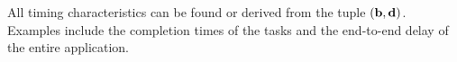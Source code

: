 All timing characteristics can be found or derived from the tuple $(\mathbf{b}, \mathbf{d})$.
Examples include the completion times of the tasks and the end-to-end delay of
the entire application.
